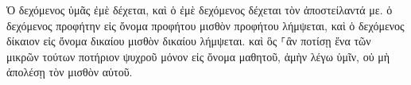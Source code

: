 \documentclass{openreader}
\begin{document}
Ὁ δεχόμενος ὑμᾶς ἐμὲ δέχεται, καὶ ὁ ἐμὲ δεχόμενος δέχεται τὸν ἀποστείλαντά με. 
ὁ δεχόμενος προφήτην εἰς ὄνομα προφήτου μισθὸν προφήτου λήμψεται, καὶ ὁ δεχόμενος δίκαιον εἰς ὄνομα δικαίου μισθὸν δικαίου λήμψεται. 
καὶ ὃς ⸀ἂν ποτίσῃ ἕνα τῶν μικρῶν τούτων ποτήριον ψυχροῦ μόνον εἰς ὄνομα μαθητοῦ, ἀμὴν λέγω ὑμῖν, οὐ μὴ ἀπολέσῃ τὸν μισθὸν αὐτοῦ. 
\end{document}
